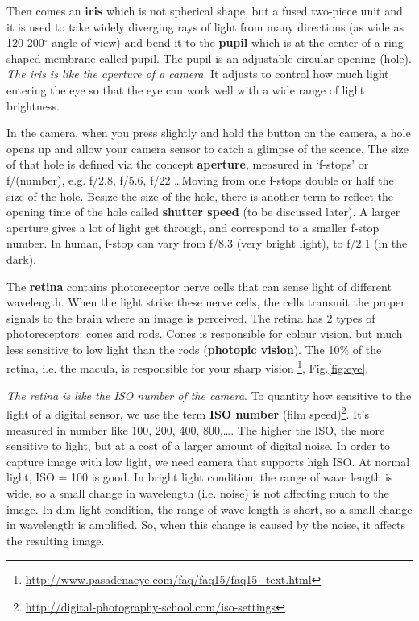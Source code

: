 Then comes an {\bf iris} which is not spherical shape, but a fused two-piece
unit and it is used to take widely diverging rays of light from many directions
(as wide as 120-200$^\circ$ angle of view) and bend it to the {\bf pupil} which
is at the center of a ring-shaped membrane called pupil. The pupil is an
adjustable circular opening (hole). {\it The iris is like the aperture of a
camera}.
It adjusts to control how much light entering the eye so that the eye can work
well with a wide range of light brightness.

In the camera, when you press slightly and hold the button on the camera, a hole
opens up and allow your camera sensor to catch a glimpse of the scence. The size
of that hole is defined via the concept {\bf aperture}, measured in `f-stops' or
f/(number), e.g. f/2.8, f/5.6, f/22 \ldots Moving from one f-stops double or
half the size of the hole. Besize the size of the hole, there is another term to
reflect the opening time of the hole called {\bf shutter speed} (to be discussed
later). A larger aperture gives a lot of light get through, and correspond to a
smaller f-stop number. In human, f-stop can vary from f/8.3 (very bright light),
to f/2.1 (in the dark).

The {\bf retina} contains photoreceptor nerve cells that can sense light of
different wavelength. When the light strike these nerve cells, the cells transmit the
proper signals to the brain where an image is perceived. The retina has 2 types
of photoreceptors: cones and rods. Cones is responsible for colour vision, but
much less sensitive to low light than the rods ({\bf photopic vision}). The 10\%
of the retina, i.e.
the macula, is responsible for your sharp vision
\footnote{\url{http://www.pasadenaeye.com/faq/faq15/faq15_text.html}},
Fig.\ref{fig:eye}.

{\it The retina is like the ISO number of the camera}. To quantity how sensitive
to the light of a digital sensor, we use the term {\bf ISO number} (film
speed)\footnote{\url{http://digital-photography-school.com/iso-settings}}. It's
measured in number like 100, 200, 400, 800,\ldots. The higher the ISO, the more
sensitive to light, but at a cost of a larger amount of digital noise. In order
to capture image with low light, we need camera that supports high ISO. At
normal light, ISO = 100 is good. In bright light condition,
the range of wave length is wide, so a small change in wavelength (i.e. noise)
is not affecting much to the image. In dim light condition, the range of wave
length is short, so a small change in wavelength is amplified. So, when this
change is caused by the noise, it affects the resulting image.


